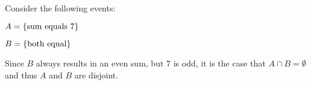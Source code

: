 \documentclass[letterpaper,12pt,fleqn]{article}
\begin{document}
\begin{example}
  Consider the following events:
  \begin{description}
  \item \(A=\{\text{sum equals 7}\}\)
  \item \(B=\{\text{both equal}\}\)
  \end{description}
  Since \(B\) always results in an even sum, but 7 is odd, it is the case that \(A\cap B=\emptyset\) and thus \(A\) and
  \(B\) are disjoint.
\end{example}
\end{document}
